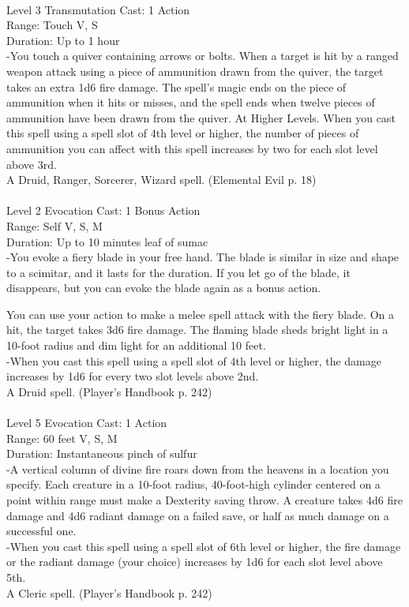\documentclass[10pt,twocolumn]{report}
\begin{document}
 \\
Level 3 \quad Transmutation \quad Cast: 1 Action\\
Range: Touch \quad V, S\\
Duration: Up to 1 hour \quad \\
-You touch a quiver containing arrows or bolts. When a target is hit by a ranged weapon attack using a piece of ammunition drawn from the quiver, the target takes an extra 1d6 fire damage. The spell’s magic ends on the piece of ammunition when it hits or misses, and the spell ends when twelve pieces of ammunition have been drawn from the quiver.
At Higher Levels. When you cast this spell using a spell slot of 4th level or higher, the number of pieces of ammunition you can affect with this spell increases by two for each slot level above 3rd.\\
A Druid, Ranger, Sorcerer, Wizard spell. (Elemental Evil p. 18) \\


 \\
Level 2 \quad Evocation \quad Cast: 1 Bonus Action\\
Range: Self \quad V, S, M\\
Duration: Up to 10 minutes \quad leaf of sumac\\
-You evoke a fiery blade in your free hand. 
The blade is similar in size and shape to a scimitar, and it lasts for the duration. If you let go of the blade, it disappears, but you can evoke the blade again as a bonus action.

You can use your action to make a melee spell attack with the fiery blade. On a hit, the target takes 3d6 fire damage. 
The flaming blade sheds bright light in a 10-foot radius and dim light for an additional 10 feet.\\
-When you cast this spell using a spell slot of 4th level or higher, the damage increases by 1d6 for every two slot levels above 2nd.\\
A Druid spell. (Player's Handbook p. 242) \\


 \\
Level 5 \quad Evocation \quad Cast: 1 Action\\
Range: 60 feet \quad V, S, M\\
Duration: Instantaneous \quad pinch of sulfur\\
-A vertical column of divine fire roars down from the heavens in a location you specify. Each creature in a 10-foot radius, 40-foot-high cylinder centered on a point within range must make a Dexterity saving throw. A creature takes 4d6 fire damage and 4d6 radiant damage on a failed save, or half as much damage on a successful one.\\
-When you cast this spell using a spell slot of 6th level or higher, the fire damage or the radiant damage (your choice) increases by 1d6 for each slot level above 5th.\\
A Cleric spell. (Player's Handbook p. 242) \\
\end{document}
